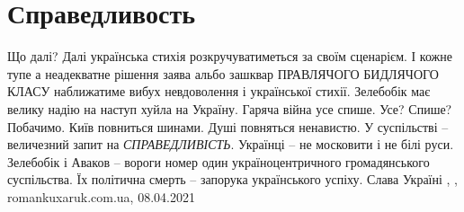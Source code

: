  
 
 
 
 
\chapter{Справедливость}
\label{sec:slova.spravedlivost}

Що далі? Далі українська стихія розкручуватиметься за своїм сценарієм.  І
кожне тупе а неадекватне рішення заява альбо зашквар ПРАВЛЯЧОГО БИДЛЯЧОГО КЛАСУ
наближатиме вибух невдоволення і української стихії.  Зелебобік має велику
надію на наступ хуйла на Україну.  Гаряча війна усе спише.  Усе?  Спише?
Побачимо.  Київ повниться шинами.  Душі повняться ненавистю.  У суспільстві --
величезний запит на \emph{СПРАВЕДЛИВІСТЬ}.  Українці -- не московити і не білі руси.
Зелебобік і Аваков -- вороги номер один україноцентричного громадянського
суспільства. Їх політична смерть -- запорука українського успіху.  Слава
Україні
, , romankuxaruk.com.ua, 08.04.2021
